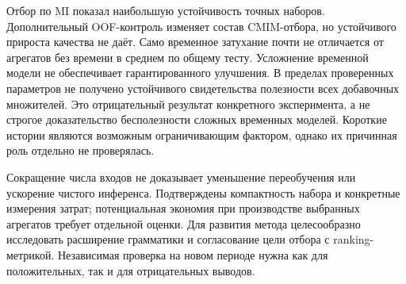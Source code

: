 \documentclass[12pt,a4paper]{article}
\begin{document}
Отбор по MI показал наибольшую устойчивость точных наборов.
Дополнительный OOF-контроль изменяет состав CMIM-отбора, но устойчивого
прироста качества не даёт. Само временное затухание почти не отличается
от агрегатов без времени в среднем по общему тесту. Усложнение временной
модели не обеспечивает гарантированного улучшения. В пределах проверенных
параметров не получено устойчивого свидетельства полезности всех
добавочных множителей. Это отрицательный результат конкретного эксперимента,
а не строгое доказательство бесполезности сложных временных моделей.
Короткие истории являются возможным ограничивающим фактором, однако их
причинная роль отдельно не проверялась.

Сокращение числа входов не доказывает уменьшение переобучения или
ускорение чистого инференса. Подтверждены компактность набора и конкретные
измерения затрат; потенциальная экономия при производстве выбранных
агрегатов требует отдельной оценки. Для развития метода целесообразно
исследовать расширение грамматики и согласование цели отбора с
ranking-метрикой. Независимая проверка на новом периоде нужна как для
положительных, так и для отрицательных выводов.
\end{document}

